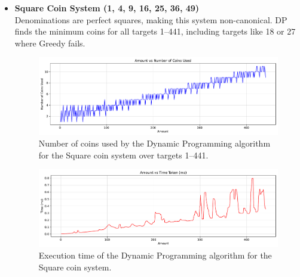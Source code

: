 \documentclass[12pt,a4paper]{report}
\begin{document}
\begin{itemize}
\newpage
    \item \textbf{Square Coin System (1, 4, 9, 16, 25, 36, 49)}\\
    Denominations are perfect squares, making this system non-canonical. DP finds the minimum coins for all targets 1--441, including targets like 18 or 27 where Greedy fails.\\
    \begin{figure}[H]
      \centering
      \includegraphics[width=\textwidth]{graphs/dp_coins_square_plot.pdf}
      \caption{Number of coins used by the Dynamic Programming algorithm for the Square coin system over targets 1--441.}
      \label{fig:dp_coins_square_plot}
    \end{figure}
    \begin{figure}[H]
      \centering
      \includegraphics[width=\textwidth]{graphs/dp_time_square_plot.pdf}
      \caption{Execution time of the Dynamic Programming algorithm for the Square coin system.}
      \label{fig:dp_time_square_plot}
    \end{figure}


\end{itemize}
\end{document}

